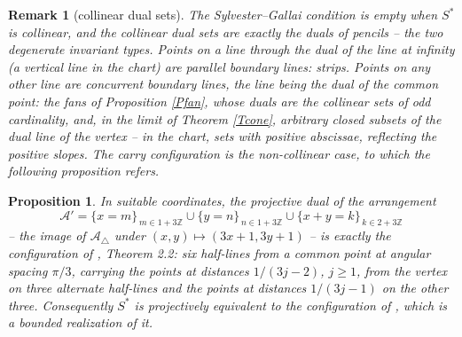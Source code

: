 \documentclass{article}
\newtheorem{proposition}{Proposition}
\newtheorem{remark}{Remark}
\def\Z{{\mathbb Z}}
\begin{document}
	\begin{remark}[collinear dual sets]
		The Sylvester--Gallai condition is empty when $S^*$ is collinear, and the collinear dual sets are exactly the duals of pencils -- the two degenerate invariant types. Points on a line through the dual of the line at infinity (a vertical line in the chart) are parallel boundary lines: strips. Points on any other line are concurrent boundary lines, the line being the dual of the common point: the fans of Proposition \ref{Pfan}, whose duals are the collinear sets of odd cardinality, and, in the limit of Theorem \ref{Tcone}, arbitrary closed subsets of the dual line of the vertex -- in the chart, sets with positive abscissae, reflecting the positive slopes. The carry configuration is the non-collinear case, to which the following proposition refers.
	\end{remark}

	\begin{proposition}\label{Pdual}
		In suitable coordinates, the projective dual of the arrangement
		$$\mathcal A'=\{x=m\}_{\,m\in 1+3\Z}\cup\{y=n\}_{\,n\in 1+3\Z}\cup\{x+y=k\}_{\,k\in 2+3\Z}$$
		-- the image of $\mathcal A_\triangle$ under $(x,y)\mapsto(3x+1,3y+1)$ -- is exactly the configuration of \cite{BDSYZ}, Theorem 2.2: six half-lines from a common point at angular spacing $\pi/3$, carrying the points at distances $1/(3j-2)$, $j\geq1$, from the vertex on three alternate half-lines and the points at distances $1/(3j-1)$ on the other three. Consequently $S^*$ is projectively equivalent to the configuration of \cite{BDSYZ}, which is a bounded realization of it.
	\end{proposition}
\end{document}
